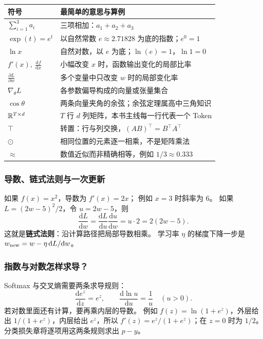 \begin{center}
\small
\renewcommand{\arraystretch}{1.36}
\begin{tabularx}{\linewidth}{@{}p{31mm}X@{}}
\toprule
符号 & 最简单的意思与算例\\
\midrule
$\sum_{i=1}^3 a_i$ & 三项相加：$a_1+a_2+a_3$\\
$\exp(t)=e^t$ & 以自然常数 $e\approx2.71828$ 为底的指数；$e^0=1$\\
$\ln x$ & 自然对数，以 $e$ 为底；$\ln(e)=1$，$\ln1=0$\\
$f'(x),\ \frac{\mathrm df}{\mathrm dx}$ & 小幅改变 $x$ 时，函数输出变化的局部比率\\
$\frac{\partial L}{\partial w}$ & 多个变量中只改变 $w$ 时的局部变化率\\
$\nabla_{\!\theta}L$ & 各参数偏导构成的向量或张量集合\\
$\cos\theta$ & 两条向量夹角的余弦；余弦定理属高中三角知识\\
$\mathbb{R}^{T\times d}$ & $T$ 行 $d$ 列矩阵，本书主线每一行代表一个 Token\\
$\top$ & 转置：行与列交换，$(AB)^\top=B^\top A^\top$\\
$\odot$ & 相同位置的元素逐一相乘，不是矩阵乘法\\
$\approx$ & 数值近似而非精确相等，例如 $1/3\approx0.333$\\
\bottomrule
\end{tabularx}
\end{center}

\subsubsection*{导数、链式法则与一次更新}

如果 $f(x)=x^2$，导数为 $f'(x)=2x$；
例如 $x=3$ 时斜率为 $6$。
如果 $L=(2w-5)^2/2$，令 $u=2w-5$，则
\[
\frac{\mathrm dL}{\mathrm dw}
=\frac{\mathrm dL}{\mathrm du}\frac{\mathrm du}{\mathrm dw}
=u\cdot2=2(2w-5).
\]
这就是\textbf{链式法则}：沿计算路径把局部导数相乘。
学习率 $\eta$ 的梯度下降一步是
$w_{\rm new}=w-\eta\,\mathrm dL/\mathrm dw$。

\subsubsection*{指数与对数怎样求导？}
\label{app:exp-log-derivatives}

Softmax 与交叉熵需要两条求导规则：
\[
\frac{\mathrm d e^z}{\mathrm dz}=e^z,\qquad
\frac{\mathrm d\ln u}{\mathrm du}=\frac1u\quad(u>0).
\]
若对数里面还有计算，要再乘内层的导数。
例如 $f(z)=\ln(1+e^z)$，外层给出 $1/(1+e^z)$，内层给出 $e^z$，所以
$f'(z)=e^z/(1+e^z)$；在 $z=0$ 时为 $1/2$。
分类损失章将逐项用这两条规则求出 $p-y$。

